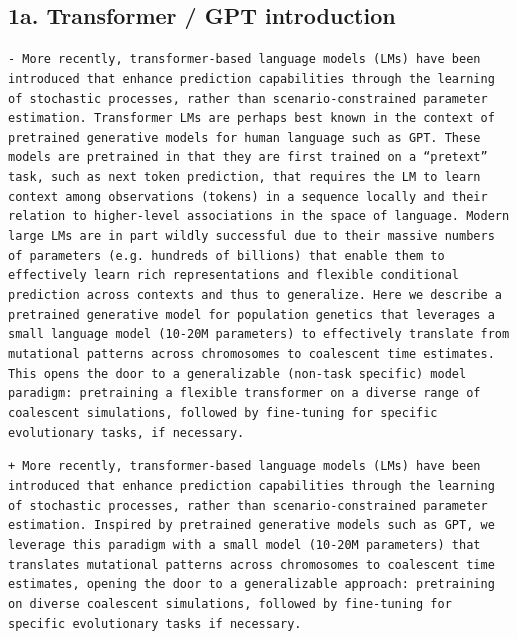 \documentclass[10pt]{article}
\newcommand{\rem}[1]{\par\noindent\colorbox{rembg}{\parbox{\dimexpr\linewidth-2\fboxsep}{\small\textcolor{remtext}{\texttt{-\ #1}}}}}
\newcommand{\add}[1]{\par\noindent\colorbox{addbg}{\parbox{\dimexpr\linewidth-2\fboxsep}{\small\textcolor{addtext}{\texttt{+\ #1}}}}}
\begin{document}
\subsection*{\small 1a. Transformer / GPT introduction}
\begin{mdframed}[style=diffbox]
\rem{More recently, transformer-based language models (LMs) have been introduced that enhance prediction capabilities through the learning of stochastic processes, rather than scenario-constrained parameter estimation. Transformer LMs are perhaps best known in the context of pretrained generative models for human language such as GPT. These models are pretrained in that they are first trained on a ``pretext'' task, such as next token prediction, that requires the LM to learn context among observations (tokens) in a sequence locally and their relation to higher-level associations in the space of language. Modern large LMs are in part wildly successful due to their massive numbers of parameters (e.g.\ hundreds of billions) that enable them to effectively learn rich representations and flexible conditional prediction across contexts and thus to generalize. Here we describe a pretrained generative model for population genetics that leverages a small language model (10-20M parameters) to effectively translate from mutational patterns across chromosomes to coalescent time estimates. This opens the door to a generalizable (non-task specific) model paradigm: pretraining a flexible transformer on a diverse range of coalescent simulations, followed by fine-tuning for specific evolutionary tasks, if necessary.}
\add{More recently, transformer-based language models (LMs) have been introduced that enhance prediction capabilities through the learning of stochastic processes, rather than scenario-constrained parameter estimation. Inspired by pretrained generative models such as GPT, we leverage this paradigm with a small model (10-20M parameters) that translates mutational patterns across chromosomes to coalescent time estimates, opening the door to a generalizable approach: pretraining on diverse coalescent simulations, followed by fine-tuning for specific evolutionary tasks if necessary.}
\end{mdframed}
\end{document}
